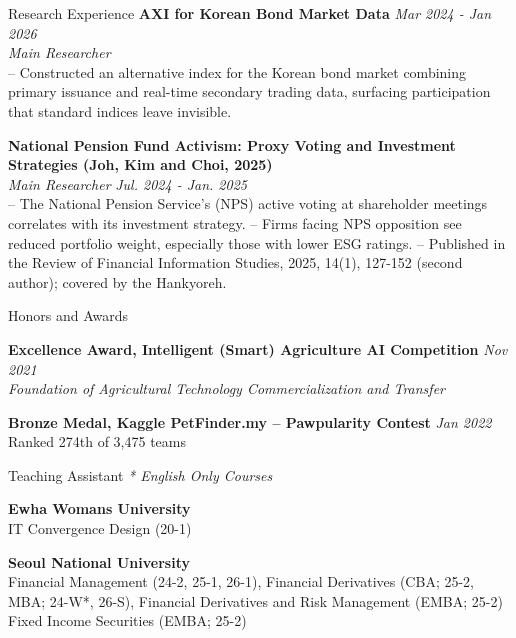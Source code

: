\documentclass{resume} %
\begin{document}
\begin{rSection}{Research Experience}
{\bf AXI for Korean Bond Market Data} \hfill {\em Mar 2024 - Jan 2026}
\\ { \textit {Main Researcher}} \\
-- Constructed an alternative index for the Korean bond market combining primary issuance and real-time secondary trading data, surfacing participation that standard indices leave invisible.


{\bf National Pension Fund Activism: Proxy Voting and Investment Strategies (Joh, Kim and Choi, 2025)}
\\ { \textit {Main Researcher}} \hfill {\em Jul. 2024 - Jan. 2025} \\
-- The National Pension Service's (NPS) active voting at shareholder meetings correlates with its investment strategy.
-- Firms facing NPS opposition see reduced portfolio weight, especially those with lower ESG ratings.
-- Published in the Review of Financial Information Studies, 2025, 14(1), 127-152 (second author); covered by the Hankyoreh.

\end{rSection}



\begin{rSection}{Honors and Awards}

{\bf Excellence Award, Intelligent (Smart) Agriculture AI Competition} \hfill {\em Nov 2021}
\\ \textit{Foundation of Agricultural Technology Commercialization and Transfer}

{\bf Bronze Medal, Kaggle PetFinder.my -- Pawpularity Contest} \hfill {\em Jan 2022}
\\ Ranked 274th of 3,475 teams

\end{rSection}



\begin{rSection}{Teaching Assistant}
\textit{* English Only Courses}

{\bf Ewha Womans University}
\\  IT Convergence Design (20-1)

{\bf Seoul National University}
\\ Financial Management (24-2, 25-1, 26-1), Financial Derivatives (CBA; 25-2, MBA; 24-W*, 26-S), Financial Derivatives and Risk Management (EMBA; 25-2) Fixed Income Securities (EMBA; 25-2)

\end{rSection}
\end{document}
